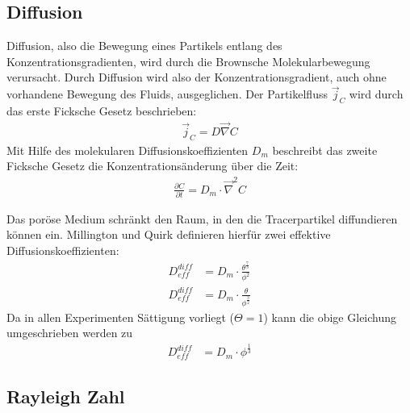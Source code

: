 
\subsection{Diffusion}
\label{sec:diff}
Diffusion, also die Bewegung eines Partikels entlang des Konzentrationsgradienten, wird durch die Brownsche Molekularbewegung verursacht. Durch Diffusion wird also der Konzentrationsgradient, auch ohne vorhandene Bewegung des Fluids, ausgeglichen. Der Partikelfluss $\vec{j}_C$ wird durch das erste Ficksche Gesetz beschrieben:
\begin{align}
 \vec{j}_C = D \vec{\nabla} C
\end{align}
Mit Hilfe des molekularen Diffusionskoeffizienten $D_m$ beschreibt das zweite Ficksche Gesetz die Konzentrationsänderung über die Zeit:
\begin{align}
 \frac{\partial C}{\partial t} = D_m \cdot \vec{\nabla}^2 C
\end{align}

Das poröse Medium schränkt den Raum, in den die Tracerpartikel diffundieren können ein. Millington und Quirk \citeyearpar{milli-quir} definieren hierfür zwei 
effektive Diffusionskoeffizienten:
\begin{align}
 D_{eff}^{diff} &= D_m \cdot \frac{\theta^{\frac{7}{3}}}{\phi^2} \\
 D_{eff}^{diff} &= D_m \cdot \frac{\theta}{              \phi^\frac{3}{2}}
\end{align}
Da in allen Experimenten Sättigung vorliegt ($\Theta = 1$) kann die obige Gleichung umgeschrieben werden zu
\begin{align}
 D_{eff}^{diff} &= D_m \cdot \phi^{\frac{1}{3}}
 \label{eq:Deff}
\end{align}

\subsection{Rayleigh Zahl}
\label{sec:ray}

